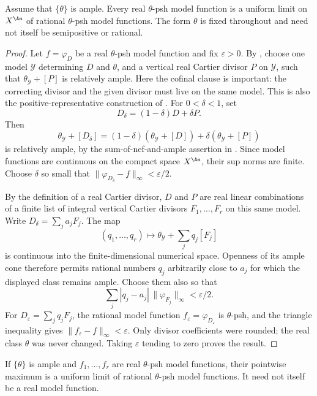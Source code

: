 \begin{lemma}
\label{lem:ch20-fixed-form-rational-approximation}
Assume that \(\{\theta\}\) is ample.  Every real \(\theta\)-psh model
function is a uniform limit on \(X^{\An}\) of rational \(\theta\)-psh
model functions.  The form \(\theta\) is fixed throughout and need not
itself be semipositive or rational.
\end{lemma}

\begin{proof}
Let \(f=\varphi_D\) be a real \(\theta\)-psh model function and fix
\(\varepsilon>0\).  By
, choose one model \(\mathcal Y\)
determining \(D\) and \(\theta\), and a vertical real Cartier divisor
\(P\) on \(\mathcal Y\), such that \(\theta_{\mathcal Y}+[P]\) is
relatively ample.  Here the cofinal clause is important: the correcting
divisor and the given divisor must live on the same model.  This is also
the positive-representative construction of \cite[Proposition 5.2]{BFJ16}.
For \(0<\delta<1\), set
\[
 D_\delta=(1-\delta)D+\delta P.
\]
Then
\[
 \theta_{\mathcal Y}+[D_\delta]
 =(1-\delta)(\theta_{\mathcal Y}+[D])
       +\delta(\theta_{\mathcal Y}+[P])
\]
is relatively ample, by the sum-of-nef-and-ample assertion in
.  Since model functions are continuous
on the compact space \(X^{\An}\), their sup norms are finite.  Choose
\(\delta\) so small that
\(\|\varphi_{D_\delta}-f\|_\infty<\varepsilon/2\).

By the definition of a real Cartier divisor, \(D\) and \(P\) are real
linear combinations of a finite list of integral vertical Cartier divisors
\(F_1,\ldots,F_r\) on this same model.  Write
\(D_\delta=\sum_j a_jF_j\).  The map
\[
 (q_1,\ldots,q_r)\longmapsto
       \theta_{\mathcal Y}+\sum_jq_j[F_j]
\]
is continuous into the finite-dimensional numerical space.  Openness of
its ample cone therefore permits rational numbers \(q_j\) arbitrarily
close to \(a_j\) for which the displayed class remains ample.  Choose
them also so that
\[
 \sum_j|q_j-a_j|\,\|\varphi_{F_j}\|_\infty<\varepsilon/2.
\]
For \(D_\varepsilon=\sum_jq_jF_j\), the rational model function
\(f_\varepsilon=\varphi_{D_\varepsilon}\) is \(\theta\)-psh, and the
triangle inequality gives \(\|f_\varepsilon-f\|_\infty<\varepsilon\).
Only divisor coefficients were rounded; the real class \(\theta\) was
never changed.  Taking \(\varepsilon\) tending to zero proves the result.
\end{proof}

\begin{corollary}
\label{cor:ch20-real-max-uniform-approximation}
If \(\{\theta\}\) is ample and \(f_1,\ldots,f_r\) are real
\(\theta\)-psh model functions, their pointwise maximum is a uniform
limit of rational \(\theta\)-psh model functions.  It need not itself
be a real model function.
\end{corollary}

